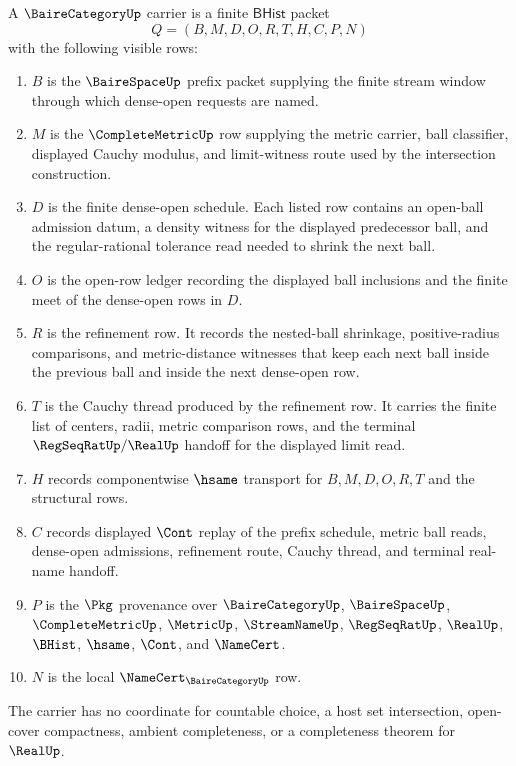 \begin{definition}
\label{def:baire-category-carrier}
A $\BaireCategoryUp$ carrier is a finite $\mathsf{BHist}$ packet
$$
Q=(B,M,D,O,R,T,H,C,P,N)
$$
with the following visible rows:
\begin{enumerate}
\item $B$ is the $\BaireSpaceUp$ prefix packet supplying the finite stream
window through which dense-open requests are named.
\item $M$ is the $\CompleteMetricUp$ row supplying the metric carrier, ball
classifier, displayed Cauchy modulus, and limit-witness route used by the
intersection construction.
\item $D$ is the finite dense-open schedule. Each listed row contains an
open-ball admission datum, a density witness for the displayed predecessor
ball, and the regular-rational tolerance read needed to shrink the next ball.
\item $O$ is the open-row ledger recording the displayed ball inclusions and
the finite meet of the dense-open rows in $D$.
\item $R$ is the refinement row. It records the nested-ball shrinkage,
positive-radius comparisons, and metric-distance witnesses that keep each next
ball inside the previous ball and inside the next dense-open row.
\item $T$ is the Cauchy thread produced by the refinement row. It carries the
finite list of centers, radii, metric comparison rows, and the terminal
$\RegSeqRatUp/\RealUp$ handoff for the displayed limit read.
\item $H$ records componentwise $\hsame$ transport for $B,M,D,O,R,T$ and the
structural rows.
\item $C$ records displayed $\Cont$ replay of the prefix schedule, metric
ball reads, dense-open admissions, refinement route, Cauchy thread, and
terminal real-name handoff.
\item $P$ is the $\Pkg$ provenance over $\BaireCategoryUp$, $\BaireSpaceUp$,
$\CompleteMetricUp$, $\MetricUp$, $\StreamNameUp$, $\RegSeqRatUp$, $\RealUp$,
$\BHist$, $\hsame$, $\Cont$, and $\NameCert$.
\item $N$ is the local $\NameCert_{\BaireCategoryUp}$ row.
\end{enumerate}
The carrier has no coordinate for countable choice, a host set intersection,
open-cover compactness, ambient completeness, or a completeness theorem for
$\RealUp$.
\end{definition}

